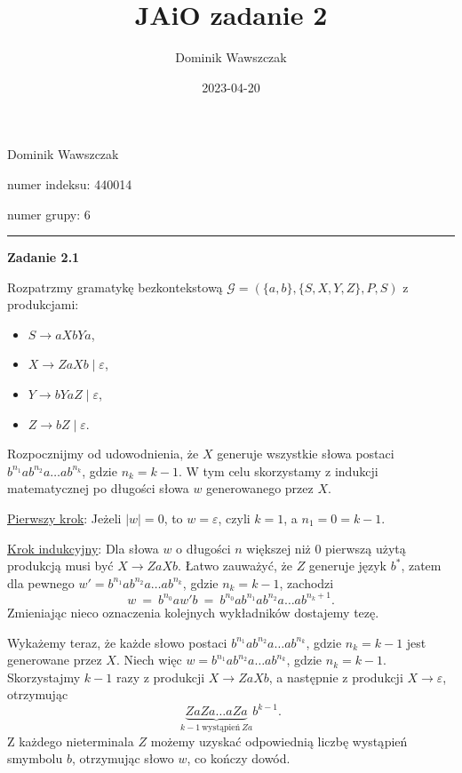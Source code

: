 \documentclass[12pt]{article}
\title{JAiO zadanie 2}
\author{Dominik Wawszczak}
\date{2023-04-20}
\begin{document}
	\setlength{\parindent}{0 cm}
	
	Dominik Wawszczak
	
	numer indeksu: 440014
	
	numer grupy: 6
	
	\bigskip
	\hrule
	\bigskip
	
	\textbf{Zadanie 2.1}
	
	\medskip
	
	Rozpatrzmy gramatykę bezkontekstową \(\mathcal{G} = \left( \{a, b\}, \{S, X,
	Y, Z\}, P, S \right)\) z produkcjami:
	\begin{itemize}
		\item \(S \longrightarrow aXbYa\),
		\item \(X \longrightarrow ZaXb \mid \varepsilon\),
		\item \(Y \longrightarrow bYaZ \mid \varepsilon\),
		\item \(Z \longrightarrow bZ \mid \varepsilon\).
	\end{itemize}
	
	\medskip
	
	Rozpocznijmy od udowodnienia, że \(X\) generuje wszystkie słowa postaci
	\(b^{n_{1}} a b^{n_{2}} a \ldots a b^{n_{k}}\), gdzie \(n_{k} = k - 1\). W
	tym celu skorzystamy z indukcji matematycznej po długości słowa \(w\)
	generowanego przez \(X\).
	
	\medskip
	
	\underline{Pierwszy krok}: Jeżeli \(\left| w \right| = 0\), to \(w =
	\varepsilon\), czyli \(k = 1\), a \(n_{1} = 0 = k - 1\).
	
	\medskip
	
	\underline{Krok indukcyjny}: Dla słowa \(w\) o długości \(n\) większej niż
	\(0\) pierwszą użytą produkcją musi być \(X \longrightarrow ZaXb\). Łatwo
	zauważyć, że \(Z\) generuje język \(b^{\ast}\), zatem dla pewnego \(w' =
	b^{n_{1}} a b^{n_{2}} a \ldots a b^{n_{k}}\), gdzie \(n_k = k - 1\),
	zachodzi
	\[ w \ = \ b^{n_{0}} a w' b \ = \ b^{n_{0}} a b^{n_{1}} a b^{n_{2}} a \ldots
	a b^{n_{k} + 1} \text{.} \]
	Zmieniając nieco oznaczenia kolejnych wykładników dostajemy tezę.
	
	\medskip
	
	Wykażemy teraz, że każde słowo postaci \(b^{n_{1}} a b^{n_{2}} a \ldots a
	b^{n_{k}}\), gdzie \(n_{k} = k - 1\) jest generowane przez \(X\). Niech więc
	\(w = b^{n_{1}} a b^{n_{2}} a \ldots a b^{n_{k}}\), gdzie \(n_{k} = k - 1\).
	Skorzystajmy \(k - 1\) razy z produkcji \(X \longrightarrow ZaXb\), a
	następnie z produkcji \(X \longrightarrow \varepsilon\), otrzymując
	\[ \underbrace{Z a Z a \ldots a Z a}_{k - 1 \ \text{wystąpień} \ Z a}
	b^{k - 1} \text{.} \]
	Z każdego nieterminala \(Z\) możemy uzyskać odpowiednią liczbę wystąpień
	smymbolu \(b\), otrzymując słowo \(w\), co kończy dowód.
	
\end{document}
